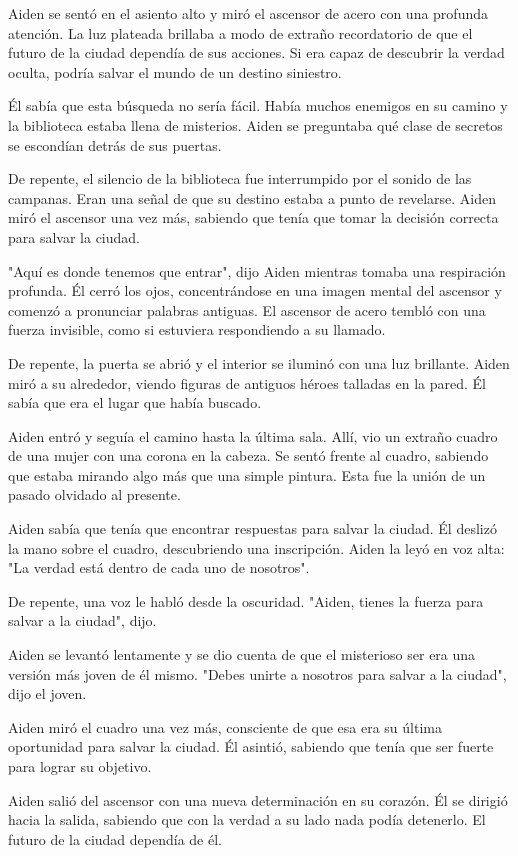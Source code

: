 
Aiden se sentó en el asiento alto y miró el ascensor de acero con una profunda atención. La luz plateada brillaba a modo de extraño recordatorio de que el futuro de la ciudad dependía de sus acciones. Si era capaz de descubrir la verdad oculta, podría salvar el mundo de un destino siniestro.

Él sabía que esta búsqueda no sería fácil. Había muchos enemigos en su camino y la biblioteca estaba llena de misterios. Aiden se preguntaba qué clase de secretos se escondían detrás de sus puertas.

De repente, el silencio de la biblioteca fue interrumpido por el sonido de las campanas. Eran una señal de que su destino estaba a punto de revelarse. Aiden miró el ascensor una vez más, sabiendo que tenía que tomar la decisión correcta para salvar la ciudad.

"Aquí es donde tenemos que entrar", dijo Aiden mientras tomaba una respiración profunda. Él cerró los ojos, concentrándose en una imagen mental del ascensor y comenzó a pronunciar palabras antiguas. El ascensor de acero tembló con una fuerza invisible, como si estuviera respondiendo a su llamado.

De repente, la puerta se abrió y el interior se iluminó con una luz brillante. Aiden miró a su alrededor, viendo figuras de antiguos héroes talladas en la pared. Él sabía que era el lugar que había buscado.

Aiden entró y seguía el camino hasta la última sala. Allí, vio un extraño cuadro de una mujer con una corona en la cabeza. Se sentó frente al cuadro, sabiendo que estaba mirando algo más que una simple pintura. Esta fue la unión de un pasado olvidado al presente.

Aiden sabía que tenía que encontrar respuestas para salvar la ciudad. Él deslizó la mano sobre el cuadro, descubriendo una inscripción. Aiden la leyó en voz alta: "La verdad está dentro de cada uno de nosotros".

De repente, una voz le habló desde la oscuridad. "Aiden, tienes la fuerza para salvar a la ciudad", dijo.

Aiden se levantó lentamente y se dio cuenta de que el misterioso ser era una versión más joven de él mismo. "Debes unirte a nosotros para salvar a la ciudad", dijo el joven.

Aiden miró el cuadro una vez más, consciente de que esa era su última oportunidad para salvar la ciudad. Él asintió, sabiendo que tenía que ser fuerte para lograr su objetivo.

Aiden salió del ascensor con una nueva determinación en su corazón. Él se dirigió hacia la salida, sabiendo que con la verdad a su lado nada podía detenerlo. El futuro de la ciudad dependía de él.